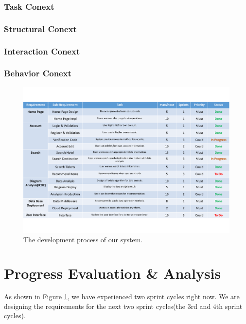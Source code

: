 \documentclass[conference]{IEEEtran}
\begin{document}
\subsubsection{\textbf{Task Conext }}


\subsubsection{\textbf{Structural Conext }}


\subsubsection{\textbf{Interaction Conext }}


\subsubsection{\textbf{Behavior Conext }}



\begin{figure}[htbp]
\centerline{\includegraphics[width=1.0\textwidth]{dev_process.pdf}}
\caption{The development process of our system.}
\label{dev_task_diagram}
\end{figure}


\section{\textbf{Progress Evaluation \& Analysis }}

As shown in Figure \ref{dev_task_diagram}, we have experienced two sprint cycles right now. We are designing the requirements for the next two sprint cycles(the 3rd and 4th sprint cycles).
\end{document}
